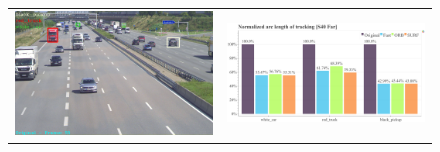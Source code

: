    


\begin{figure}[!ht]
  \centering
  \begin{tabular}{cc}
    \includegraphics[width=0.45\linewidth]{diagrams/object_tracking/s40_n_far/frame.png}    &  
    \includegraphics[width=0.475\linewidth]{diagrams/object_tracking/s40_n_far/normalized_arc_lengths.html.png}    \\


\end{tabular}
\end{figure}
